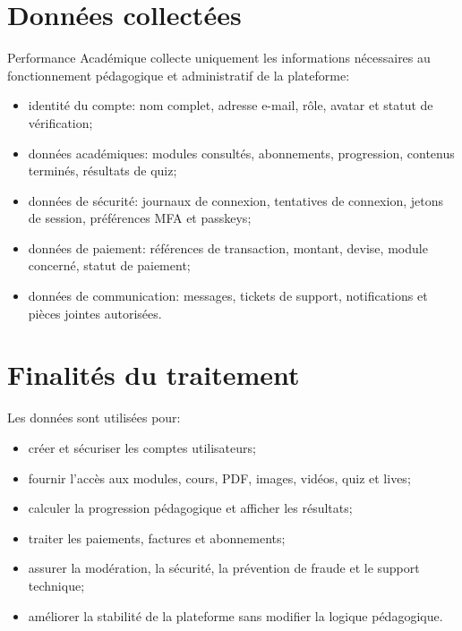 \documentclass[11pt,a4paper]{article}
\begin{document}
\PAMakeCover
{}

\hfill
{}

\hfill
{}

\section{Données collectées}
Performance Académique collecte uniquement les informations nécessaires au fonctionnement pédagogique et administratif de la plateforme:
\begin{itemize}
  \item identité du compte: nom complet, adresse e-mail, rôle, avatar et statut de vérification;
  \item données académiques: modules consultés, abonnements, progression, contenus terminés, résultats de quiz;
  \item données de sécurité: journaux de connexion, tentatives de connexion, jetons de session, préférences MFA et passkeys;
  \item données de paiement: références de transaction, montant, devise, module concerné, statut de paiement;
  \item données de communication: messages, tickets de support, notifications et pièces jointes autorisées.
\end{itemize}

\section{Finalités du traitement}
Les données sont utilisées pour:
\begin{itemize}
  \item créer et sécuriser les comptes utilisateurs;
  \item fournir l'accès aux modules, cours, PDF, images, vidéos, quiz et lives;
  \item calculer la progression pédagogique et afficher les résultats;
  \item traiter les paiements, factures et abonnements;
  \item assurer la modération, la sécurité, la prévention de fraude et le support technique;
  \item améliorer la stabilité de la plateforme sans modifier la logique pédagogique.
\end{itemize}
\end{document}
